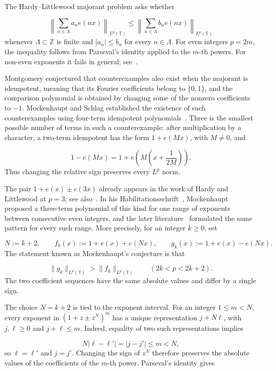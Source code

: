 \documentclass[11pt]{article}
\theoremstyle{plain}
\theoremstyle{definition}
\theoremstyle{remark}
\begin{document}
The Hardy--Littlewood majorant problem asks whether

\[
  \left\| \sum_{n \in \Lambda } a_n e(nx) \right\|_{L^p(\mathbb{T})} \le \left\| \sum_{n \in \Lambda } b_n e(nx) \right\|_{L^p(\mathbb{T})}
\]
whenever $\Lambda \subset \mathbb{Z}$ is finite and $|a_n| \le b_n$ for every $n \in \Lambda$. For even integers $p = 2m$, the inequality follows from Parseval's identity applied to the $m$-th powers. For non-even exponents it fails in general; see~\cite{r2,r3,r4,r7}.

Montgomery conjectured that counterexamples also exist when the majorant is idempotent, meaning that its Fourier coefficients belong to $\{0,1\}$, and the comparison polynomial is obtained by changing some of the nonzero coefficients to $-1$. Mockenhaupt and Schlag established the existence of such counterexamples using four-term idempotent polynomials~\cite{r7}. Three is the smallest possible number of terms in such a counterexample: after multiplication by a character, a two-term idempotent has the form $1 + e(Mx)$, with $M \ne 0$, and

\[
  1 - e(Mx) = 1 + e\left( M \left( x + \frac{1}{2M} \right) \right) .
\]
Thus changing the relative sign preserves every $L^p$ norm.

The pair $1 + e(x) \pm e(3x)$ already appears in the work of Hardy and Littlewood at $p = 3$; see also~\cite{r4}. In his Habilitationsschrift~\cite{r9}, Mockenhaupt proposed a three-term polynomial of this kind for one range of exponents between consecutive even integers, and the later literature~\cite{r4,r5,r6} formulated the same pattern for every such range. More precisely, for an integer $k \ge 0$, set

\[
  N := k+2, \qquad  f_k(x) := 1 + e(x) + e(Nx), \qquad  g_k(x) := 1 + e(x) - e(Nx) .
\]
The statement known as Mockenhaupt's conjecture is that

\begin{equation}\label{eq:conj}
  \|g_k\|_{L^p(\mathbb{T})} > \|f_k\|_{L^p(\mathbb{T})} \qquad  (2k < p < 2k+2) .
\end{equation}
The two coefficient sequences have the same absolute values and differ by a single sign.

The choice $N = k+2$ is tied to the exponent interval. For an integer $1 \le m < N$, every exponent in $(1 + z \pm z^N)^m$ has a unique representation $j + N\ell$, with $j, \ell \ge 0$ and $j + \ell \le m$. Indeed, equality of two such representations implies

\[
  N|\ell - \ell '| = |j - j'| \le m < N ,
\]
so $\ell = \ell '$ and $j = j'$. Changing the sign of $z^N$ therefore preserves the absolute values of the coefficients of the $m$-th power. Parseval's identity gives
\end{document}
